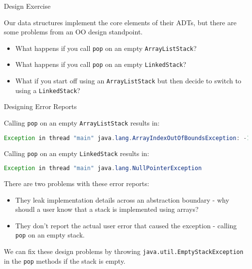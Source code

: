 \documentclass{beamer}
\begin{document}
\begin{frame}[fragile]{Design Exercise}


Our data structures implement the core elements of their ADTs, but there are some problems from an OO design standpoint.
\begin{itemize}
\item What happens if you call {\tt pop} on an empty {\tt ArrayListStack}?
\item What happens if you call {\tt pop} on an empty {\tt LinkedStack}?
\item What if you start off using an {\tt ArrayListStack} but then decide to switch to using a {\tt LinkedStack}?
\end{itemize}


\end{frame}

\begin{frame}[fragile]{Designing Error Reports}


Calling {\tt pop} on an empty {\tt ArrayListStack} results in:
\begin{lstlisting}[language=Java]
Exception in thread "main" java.lang.ArrayIndexOutOfBoundsException: -1
\end{lstlisting}

Calling {\tt pop} on an empty {\tt LinkedStack} results in:
\begin{lstlisting}[language=Java]
Exception in thread "main" java.lang.NullPointerException
\end{lstlisting}
There are two problems with these error reports:
\begin{itemize}
\item They leak implementation details across an abstraction boundary - why shoudl a user know that a stack is implemented using arrays?
\item They don't report the actual user error that caused the exception - calling {\tt pop} on an empty stack.
\end{itemize}

We can fix these design problems by throwing {\tt java.util.EmptyStackException} in the {\tt pop} methods if the stack is empty.

\end{frame}
\end{document}
